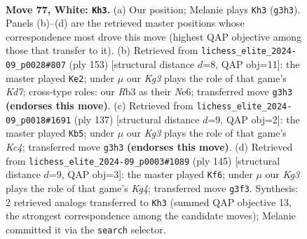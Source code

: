 \documentclass[11pt]{article}
\begin{document}
\clearpage

\begin{figure}[p]\centering
\begin{subfigure}{0.46\textwidth}\centering
\resizebox{\linewidth}{!}{%
\newchessgame
\chessboard[
  setfen={8/k7/8/8/8/1R1N2K1/6P1/3r4 w - - 18 77},
  showmover=false,
  pgfstyle=straightmove, color=movearrow, markmove={g3-h3}
]}
\caption{}
\end{subfigure}\hfill
\begin{subfigure}{0.46\textwidth}\centering
\resizebox{\linewidth}{!}{%
\newchessgame
\chessboard[
  setfen={8/8/4n3/8/8/3p4/3k4/1K1n3R b - - 7 77},
  showmover=false,
  pgfstyle=straightmove, color=movearrow, markmove={d2-e2}
]}
\caption{}
\end{subfigure}
\\[4pt]
\begin{subfigure}{0.46\textwidth}\centering
\resizebox{\linewidth}{!}{%
\newchessgame
\chessboard[
  setfen={8/8/2p5/2k5/4K3/8/2R5/3r4 b - - 21 69},
  showmover=false,
  pgfstyle=straightmove, color=movearrow, markmove={c5-b5}
]}
\caption{}
\end{subfigure}\hfill
\begin{subfigure}{0.46\textwidth}\centering
\resizebox{\linewidth}{!}{%
\newchessgame
\chessboard[
  setfen={8/8/6p1/4R1k1/8/5K2/8/6r1 b - - 3 73},
  showmover=false,
  pgfstyle=straightmove, color=movearrow, markmove={g5-f6}
]}
\caption{}
\end{subfigure}
\caption{\textbf{Move 77, White: \texttt{Kh3}.} (a) Our position; Melanie plays \texttt{Kh3} (\texttt{g3h3}). Panels (b)--(d) are the retrieved master positions whose correspondence most drove this move (highest QAP objective among those that transfer to it). (b) Retrieved from \texttt{lichess\_elite\_2024-09\_p0028\#807} (ply 153) [structural distance $d$=8, QAP obj=11]: the master played \texttt{Ke2}; under $\mu$ our \emph{Kg3} plays the role of that game's \emph{Kd7}; cross-type roles: our \emph{R}b3 as their \emph{N}e6; transferred move \texttt{g3h3} \textbf{(endorses this move)}. (c) Retrieved from \texttt{lichess\_elite\_2024-09\_p0018\#1691} (ply 137) [structural distance $d$=9, QAP obj=2]: the master played \texttt{Kb5}; under $\mu$ our \emph{Kg3} plays the role of that game's \emph{Kc4}; transferred move \texttt{g3h3} \textbf{(endorses this move)}. (d) Retrieved from \texttt{lichess\_elite\_2024-09\_p0003\#1089} (ply 145) [structural distance $d$=9, QAP obj=3]: the master played \texttt{Kf6}; under $\mu$ our \emph{Kg3} plays the role of that game's \emph{Kg4}; transferred move \texttt{g3f3}. Synthesis: 2 retrieved analogs transferred to \texttt{Kh3} (summed QAP objective 13, the strongest correspondence among the candidate moves); Melanie committed it via the \texttt{search} selector.}
\label{fig:thought-m152}
\end{figure}
\end{document}
